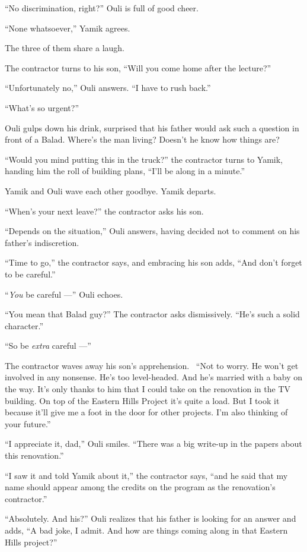 \documentclass[twoside,11pt]{book}
\begin{document}
``No discrimination, right?'' Ouli is full of good cheer.

``None whatsoever,'' Yamik agrees.

The three of them share a laugh.

The contractor turns to his son, ``Will you come home after the lecture?''

``Unfortunately no,'' Ouli answers. ``I have to rush back.''

``What's so urgent?''

Ouli gulps down his drink, surprised that his father would ask such a question in front of a Balad. Where's the man
living? Doesn't he know how things are?

``Would you mind putting this in the truck?'' the contractor turns to Yamik, handing him the roll of building plans,
``I'll be along in a minute.''

Yamik and Ouli wave each other goodbye. Yamik departs.

``When's your next leave?'' the contractor asks his son.

``Depends on the situation,'' Ouli answers, having decided not to comment on his
father's indiscretion.

``Time to go,'' the contractor says, and embracing his son adds, ``And don't
forget to be careful.''

``\textit{You} be careful ---'' Ouli echoes.

``You mean that Balad guy?'' The contractor asks dismissively. ``He's such a
solid character.''

``So be \textit{extra} careful ---''

The contractor waves away his son's apprehension.~ ``Not to worry. He won't get involved in any nonsense.
He's too level-headed. And he's married with a baby on the way. It's only thanks to him that I could take on the
renovation in the TV building. On top of the Eastern Hills Project it's quite a load. But I took it because it'll give
me a foot in the door for other projects. I'm also thinking of your future.''

``I appreciate it, dad,'' Ouli smiles. ``There was a big write-up in the papers
about this renovation.''

``I saw it and told Yamik about it,'' the contractor says, ``and he said that my
name should appear among the credits on the program as the renovation's contractor.''

``Absolutely. And his?'' Ouli realizes that his father is looking for an answer and adds,
``A bad joke, I admit. And how are things coming along in that Eastern Hills project?''
\end{document}
